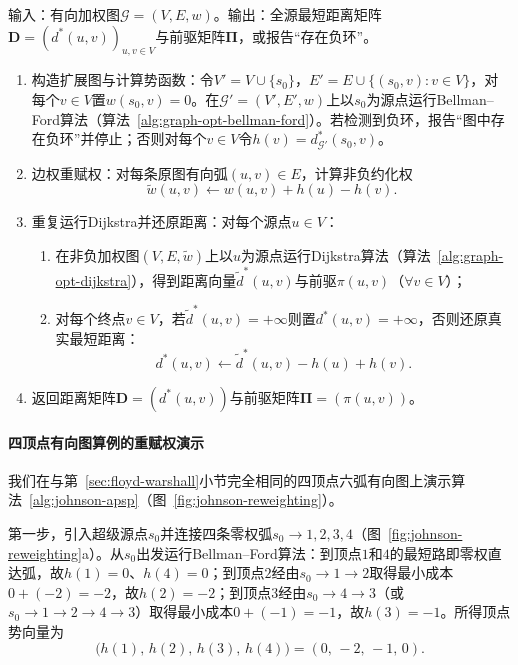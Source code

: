 \begin{algorithm}[Johnson全源最短路算法]
\label{alg:johnson-apsp}
输入：有向加权图$\mathcal G=(V,E,w)$。输出：全源最短距离矩阵$\bm D=(d^*(u,v))_{u,v\in V}$与前驱矩阵$\bm\Pi$，或报告“存在负环”。
\begin{enumerate}
  \item 构造扩展图与计算势函数：令$V'=V\cup\{s_0\}$，$E'=E\cup\{(s_0,v):v\in V\}$，对每个$v\in V$置$w(s_0,v)=0$。在$\mathcal G'=(V',E',w)$上以$s_0$为源点运行Bellman--Ford算法（算法~\ref{alg:graph-opt-bellman-ford}）。若检测到负环，报告“图中存在负环”并停止；否则对每个$v\in V$令$h(v)=d^*_{\mathcal G'}(s_0,v)$。
  \item 边权重赋权：对每条原图有向弧$(u,v)\in E$，计算非负约化权
  \[
    \tilde w(u,v) \gets w(u,v) + h(u) - h(v).
  \]
  \item 重复运行Dijkstra并还原距离：对每个源点$u\in V$：
    \begin{enumerate}
      \item 在非负加权图$(V,E,\tilde w)$上以$u$为源点运行Dijkstra算法（算法~\ref{alg:graph-opt-dijkstra}），得到距离向量$\tilde d^*(u,v)$与前驱$\pi(u,v)$（$\forall v\in V$）；
      \item 对每个终点$v\in V$，若$\tilde d^*(u,v)=+\infty$则置$d^*(u,v)=+\infty$，否则还原真实最短距离：
      \[
        d^*(u,v) \gets \tilde d^*(u,v) - h(u) + h(v).
      \]
    \end{enumerate}
  \item 返回距离矩阵$\bm D=(d^*(u,v))$与前驱矩阵$\bm\Pi=(\pi(u,v))$。
\end{enumerate}
\end{algorithm}

\paragraph{四顶点有向图算例的重赋权演示}
我们在与第~\ref{sec:floyd-warshall}小节完全相同的四顶点六弧有向图上演示算法~\ref{alg:johnson-apsp}（图~\ref{fig:johnson-reweighting}）。

第一步，引入超级源点$s_0$并连接四条零权弧$s_0\to 1,2,3,4$（图~\ref{fig:johnson-reweighting}a）。从$s_0$出发运行Bellman--Ford算法：到顶点$1$和$4$的最短路即零权直达弧，故$h(1)=0$、$h(4)=0$；到顶点$2$经由$s_0\to 1\to 2$取得最小成本$0+(-2)=-2$，故$h(2)=-2$；到顶点$3$经由$s_0\to 4\to 3$（或$s_0\to 1\to 2\to 4\to 3$）取得最小成本$0+(-1)=-1$，故$h(3)=-1$。所得顶点势向量为
\[
  \bigl(h(1),\,h(2),\,h(3),\,h(4)\bigr) = (0,\,-2,\,-1,\,0).
\]

